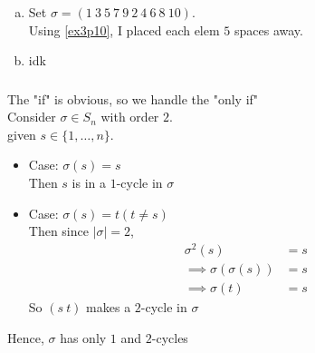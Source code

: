 \documentclass{article}
\newcommand{\set}[1]{ \{ #1 \} }
\begin{document}
\subsubsection{}\label{ex3p12}
\begin{enumerate}[(a)]
\item Set $\sigma = (1\ 3\ 5\ 7\ 9\ 2\ 4\ 6\ 8\ 10)$.\\
Using \ref{ex3p10}, I placed each elem $5$ spaces away.
\item idk
\end{enumerate}
\subsubsection{}\label{ex3p13}
The "if" is obvious, so we handle the "only if"\\
Consider $\sigma \in S_n$ with order $2$.\\
given $s \in \set{1,\ldots,n}$.\\
\begin{itemize}
\item Case: $\sigma(s) = s$\\
Then $s$ is in a $1$-cycle in $\sigma$
\item Case: $\sigma(s) = t (t \neq s)$\\
Then since $|\sigma| =2$, 
\begin{align*}
\sigma^2(s) &= s\\
\implies \sigma(\sigma(s)) &= s\\
\implies \sigma(t) &= s
\end{align*}
So $(s\ t)$ makes a $2$-cycle in $\sigma$
\end{itemize}
Hence, $\sigma$ has only $1$ and $2$-cycles
\end{document}

